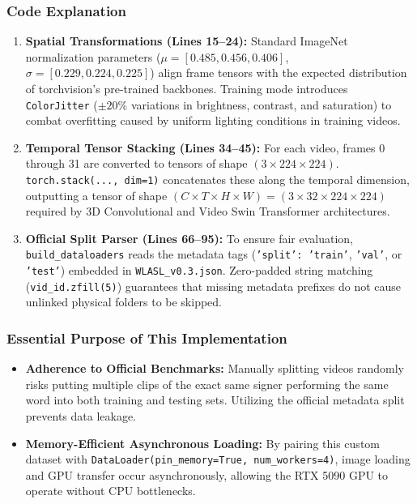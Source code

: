 \documentclass[12pt,a4paper]{article}
\begin{document}
\subsubsection{Code Explanation}
\begin{enumerate}
    \item \textbf{Spatial Transformations (Lines 15--24):} Standard ImageNet normalization parameters ($\mu = [0.485, 0.456, 0.406]$, $\sigma = [0.229, 0.224, 0.225]$) align frame tensors with the expected distribution of torchvision's pre-trained backbones. Training mode introduces \texttt{ColorJitter} ($\pm 20\%$ variations in brightness, contrast, and saturation) to combat overfitting caused by uniform lighting conditions in training videos.
    \item \textbf{Temporal Tensor Stacking (Lines 34--45):} For each video, frames 0 through 31 are converted to tensors of shape $(3 \times 224 \times 224)$. \texttt{torch.stack(..., dim=1)} concatenates these along the temporal dimension, outputting a tensor of shape $(C \times T \times H \times W) = (3 \times 32 \times 224 \times 224)$ required by 3D Convolutional and Video Swin Transformer architectures.
    \item \textbf{Official Split Parser (Lines 66--95):} To ensure fair evaluation, \texttt{build\_dataloaders} reads the metadata tags (\texttt{'split': 'train'}, \texttt{'val'}, or \texttt{'test'}) embedded in \texttt{WLASL\_v0.3.json}. Zero-padded string matching (\texttt{vid\_id.zfill(5)}) guarantees that missing metadata prefixes do not cause unlinked physical folders to be skipped.
\end{enumerate}

\subsubsection{Essential Purpose of This Implementation}
\begin{itemize}
    \item \textbf{Adherence to Official Benchmarks:} Manually splitting videos randomly risks putting multiple clips of the exact same signer performing the same word into both training and testing sets. Utilizing the official metadata split prevents data leakage.
    \item \textbf{Memory-Efficient Asynchronous Loading:} By pairing this custom dataset with \texttt{DataLoader(pin\_memory=True, num\_workers=4)}, image loading and GPU transfer occur asynchronously, allowing the RTX 5090 GPU to operate without CPU bottlenecks.
\end{itemize}
\end{document}
